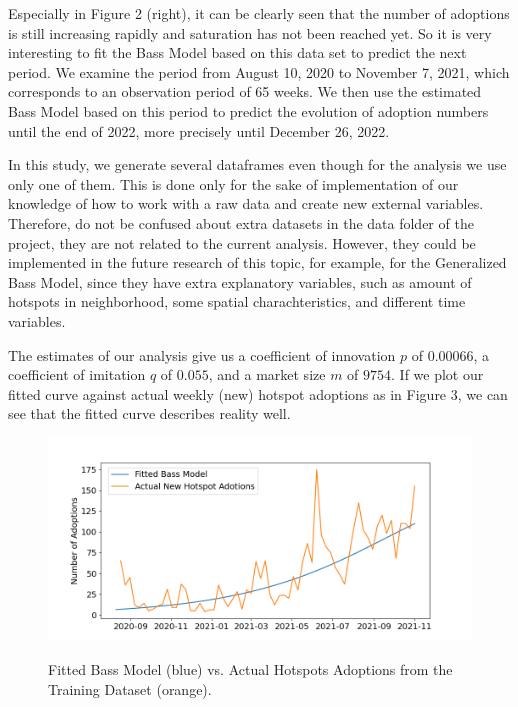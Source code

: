 \documentclass{article}
\begin{document}
\noindent Especially in Figure 2 (right), it can be clearly seen that the number of adoptions is still increasing rapidly and saturation has not been reached yet.
So it is very interesting to fit the Bass Model based on this data set to predict the next period. We examine the period from August 10, 2020 to November 7, 2021,
which corresponds to an observation period of 65 weeks. We then use the estimated Bass Model based on this period to predict the evolution of adoption numbers until
the end of 2022, more precisely until December 26, 2022.

In this study, we generate several dataframes even though for the analysis we use only one of them. 
This is done only for the sake of implementation of our knowledge of how to work with a raw data and create new external variables.
Therefore, do not be confused about extra datasets in the data folder of the project, they are not related to the current analysis. 
However, they could be implemented in the future research of this topic, for example, for the Generalized Bass Model, since they
have extra explanatory variables, such as amount of hotspots in neighborhood, some spatial charachteristics, and different time variables.

\bigskip

\noindent The estimates of our analysis give us a coefficient of innovation $p$ of $0.00066$, a coefficient of imitation $q$ of $0.055$, and a market size $m$ of $9754$. If we
plot our fitted curve against actual weekly (new) hotspot adoptions as in Figure 3, we can see that the fitted curve describes reality well.

\begin{figure}[!hptb]
    \centering{}\includegraphics[scale=0.6]{plots/bass_model_adoptions_vs_actual_adoptions.png}\\
    \caption{Fitted Bass Model (blue) vs. Actual Hotspots Adoptions from the Training Dataset (orange).}
\end{figure}
\end{document}
